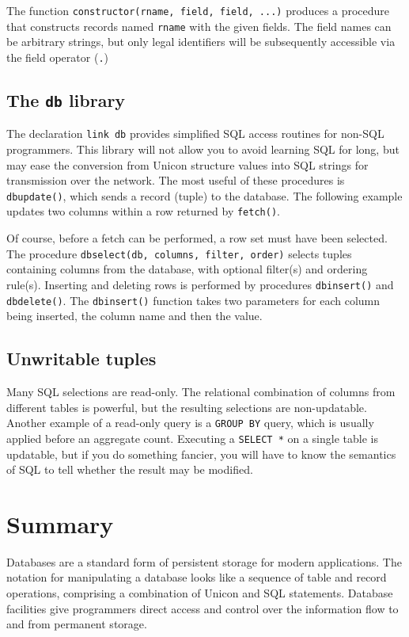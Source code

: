 The function \texttt{constructor(rname, field, field, ...)} produces a
procedure that constructs records named
\texttt{rname} with the given fields. The field names
can be arbitrary strings, but only legal identifiers
will be subsequently accessible via the field operator (\texttt{.})

\subsection*{The \texttt{db} library}

The declaration \texttt{link db} provides simplified SQL access routines
for non-SQL programmers.
This library will not allow you to avoid learning SQL for long,
but may ease the conversion from Unicon structure values into SQL
strings for transmission over the network.
The most useful of these procedures is \texttt{dbupdate()}, which sends
a record (tuple) to the database. The following example updates two
columns within a row returned by \texttt{fetch()}.


Of course, before a fetch can be performed, a row set must have been
selected. The procedure \texttt{dbselect(db, columns, filter, order)}
selects tuples containing columns from the database, with optional
filter(s) and ordering rule(s).
Inserting and deleting rows is performed by procedures
\texttt{dbinsert()} and \texttt{dbdelete()}. The \texttt{dbinsert()}
function takes two parameters for each column being inserted, the
column name and then the value.

\subsection*{Unwritable tuples}

Many SQL selections are read-only.  The relational combination of
columns from different tables is powerful, but the resulting
selections are non-updatable.  Another example of a read-only query is
a \texttt{GROUP BY} query, which is usually applied before an
aggregate count. Executing a \texttt{SELECT *} on a single table is
updatable, but if you do something fancier, you will have to know the
semantics of SQL to tell whether the result may be modified.

\section{Summary}

Databases are a standard form of persistent storage for modern
applications. The notation for manipulating a database looks like
a sequence of table and record operations, comprising a
combination of Unicon and SQL statements. Database
facilities give programmers direct access and control over the
information flow to and from permanent storage.
